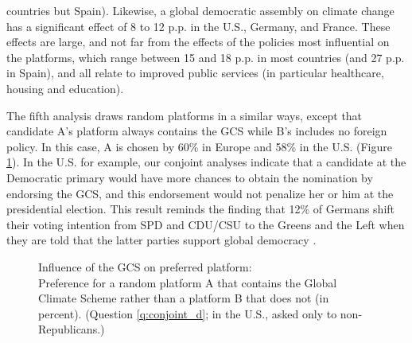\clearpage 
\noindent countries but Spain). 
Likewise, a global democratic assembly on climate change has a significant effect of 8 to 12 p.p. in the U.S., Germany, and France. 
These effects are large, and not far from the effects of the policies most influential on the platforms, which range between 15 and 18 p.p. in most countries (and 27 p.p. in Spain), and all relate to improved public services (in particular healthcare, housing and education). 

The fifth analysis draws random platforms in a similar ways, except that candidate A's platform always contains the GCS while B's includes no foreign policy. In this case, A is chosen by 60\% in Europe %
and 58\% in the U.S. (Figure \ref{fig:conjoint_left_ag_b}). %
In the U.S. for example, our conjoint analyses indicate that a candidate at the Democratic primary would have more chances to obtain the nomination by endorsing the GCS, and this endorsement would not penalize her or him at the presidential election. This result reminds the finding that 12\% of Germans shift their voting intention from SPD and CDU/CSU to the Greens and the Left when they are told that the latter parties support global democracy \citep{ghassim_who_2020}.

\begin{figure}[h!]
    \caption[Influence of the GCS on preferred platform]{Influence of the GCS on preferred platform:\\ Preference for a random platform A that contains the Global Climate Scheme rather than a platform B that does not (in percent). (Question \ref{q:conjoint_d}; in the U.S., asked only to non-Republicans.)}\label{fig:conjoint_left_ag_b}
\end{figure}

